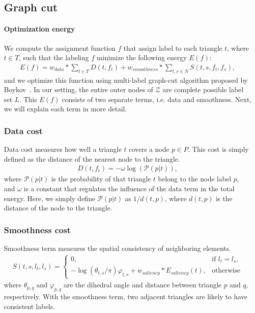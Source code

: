 \subsection{Graph cut}
\paragraph{Optimization energy}
We compute the assignment function $f$ that assign label to each triangle $t$, where $t \in T$, such that the labeling $f$ minimize the following energy $E(f)$:
\begin{align} \label{eq:graph}
E(f) = w_{data} * \sum_{t\in T}D(t, f_t) + w_{smoothness} * \sum_{t,s\in N} S(t, s, f_t, f_s),
\end{align}
and we optimize this function using multi-label graph-cut algorithm proposed by Boykov~\cite{boykov:2004:experimental}.
In our setting, the entire outer nodes of $\mathcal{Z}$ are complete possible label set $L$.
This $E(f)$ consists of two separate terms, i.e. data and smoothness.
Next, we will explain each term in more detail.

\subsubsection{Data cost}
Data cost measures how well a triangle $t$ covers a node $p \in P$.
This cost is simply defined as the distance of the nearest node to the triangle.
\begin{align}
D(t, f_t) = -\omega \log(\mathcal{P}(p | t)),
\end{align}
where $\mathcal{P}(p | t)$ is the probability of that triangle $t$ belong to the node label $p$, and $\omega$ is a constant that
regulates the influence of the data term in the total energy.
Here, we simply define $\mathcal{P}(p | t)$ as $1/d(t,p)$, where $d(t,p)$ is the distance of the node to the triangle.
\subsubsection{Smoothness cost}
Smoothness term measures the spatial consistency of neighboring elements.
\begin{align}
S(t, s, l_t, l_s) = 
\begin{cases}
0, & \text{if } l_t = l_s, \\
-\log(\theta_{t,s}/\pi)\varphi_{t,s} + w_{saliency} * E_{saliency}(t), & \text{otherwise} 
\end{cases}
\end{align}
where $\theta_{p,q}$ and $\varphi_{p,q}$ are the dihedral angle and distance between triangle $p$ and $q$, respectively.
With the smoothness term, two adjacent triangles are likely to have consistent labels.

